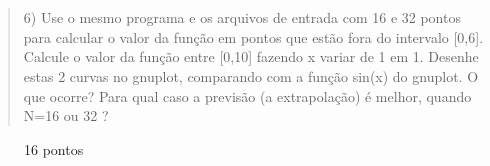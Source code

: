 \documentclass[brazilian,12pt,a4paper,final]{article}
\begin{document}
\section{}
\begin{quote}
6) Use o mesmo programa e os arquivos de entrada com 16 e 32 pontos para calcular o valor da função em pontos que estão fora do intervalo [0,6]. Calcule o valor da função entre [0,10] fazendo x variar de 1 em 1. Desenhe estas 2 curvas no gnuplot, comparando com a função sin(x) do gnuplot.
O que ocorre? Para qual caso a previsão (a extrapolação) é melhor, quando N=16 ou 32 ? 
\end{quote}

\begin{figure}[htbp]
\begin{center}
\caption{16 pontos}
\label{fig_rotacao}
\end{center}
\end{figure}
\end{document}
